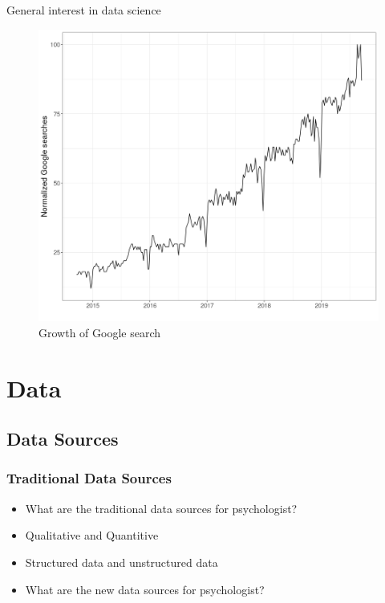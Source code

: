 \begin{frame}{General interest in data science}
    \begin{figure}
    \caption{Growth of Google search}
    \includegraphics[width = .8\framewidth]{png/ds-searches.png}

    \end{figure}
\end{frame}

\section[Data]{Data}

\subsection[Data Sources]{Data Sources}

\begin{frame}
    \frametitle{Traditional Data Sources}
    \begin{itemize}
        \item What are the traditional data sources for psychologist?
        \item Qualitative and Quantitive
        \item Structured data and unstructured data
        \item What are the new data sources for psychologist?
    \end{itemize}
\end{frame}

